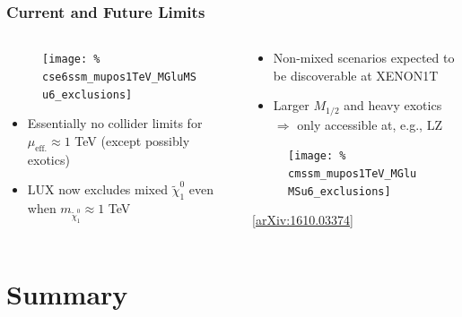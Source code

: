 \documentclass[10pt,aspectratio=169]{beamer}
\begin{document}
\begin{frame}
  \frametitle{Current and Future Limits}
  \begin{columns}[t]
    \begin{column}{0.5\textwidth}
      \vspace{-22pt}
      \begin{figure}
        \texttt{[image: \%
          cse6ssm\_mupos1TeV\_MGluMSu6\_exclusions]}
      \end{figure}
      \vspace*{-8pt}
      \begin{itemize}\itemsep1em
        \item Essentially no collider limits for $\mu_{\text{eff.}}
          \approx 1$ TeV ({\color{blue}except possibly exotics})
        \item {\color{red} LUX now excludes mixed
          $\tilde{\chi}_1^0$ even when $m_{\tilde{\chi}_1^0} \approx 1$ TeV}
      \end{itemize}
    \end{column}
    \begin{column}{0.5\textwidth}
      \vspace{-22pt}
      \begin{itemize}\itemsep1em
        \item Non-mixed scenarios expected to be discoverable at
          XENON1T
        \item Larger $M_{1/2}$ and heavy exotics $\Rightarrow$ only
          accessible at, e.g., LZ
      \end{itemize}
      \begin{figure}
        \texttt{[image: \%
          cmssm\_mupos1TeV\_MGluMSu6\_exclusions]}
      \end{figure}
      \vspace{-20pt}
      \begin{center}
        \tiny [\href{https://arxiv.org/abs/1610.03374}{arXiv:1610.03374}]
      \end{center}
    \end{column}
  \end{columns}
\end{frame}

\section{Summary}
\end{document}
